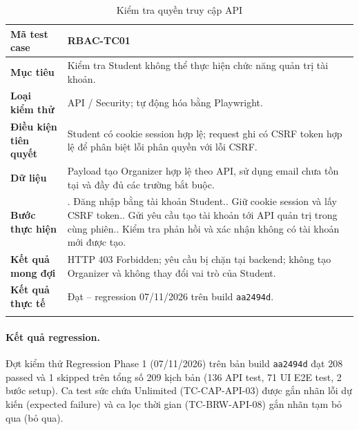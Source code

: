 \begin{table}[H]
\centering
\begingroup\small
\renewcommand{\arraystretch}{1.18}
\caption{Kiểm tra quyền truy cập API}\label{tab:i1-detail-5}
\begin{tabularx}{\linewidth}{@{}p{.23\linewidth}>{\raggedright\arraybackslash}X@{}}
\toprule
\textbf{Mã test case} & \textbf{RBAC-TC01} \\\midrule
\textbf{Mục tiêu} & Kiểm tra Student không thể thực hiện chức năng quản trị tài khoản. \\ \addlinespace[3pt]
\textbf{Loại kiểm thử} & API / Security; tự động hóa bằng Playwright. \\ \addlinespace[3pt]
\textbf{Điều kiện tiên quyết} & Student có cookie session hợp lệ; request ghi có CSRF token hợp lệ để phân biệt lỗi phân quyền với lỗi CSRF. \\ \addlinespace[3pt]
\textbf{Dữ liệu} & Payload tạo Organizer hợp lệ theo API, sử dụng email chưa tồn tại và đầy đủ các trường bắt buộc. \\ \addlinespace[3pt]
\textbf{Bước thực hiện} & 1. Đăng nhập bằng tài khoản Student.\newline 2. Giữ cookie session và lấy CSRF token.\newline 3. Gửi yêu cầu tạo tài khoản tới API quản trị trong cùng phiên.\newline 4. Kiểm tra phản hồi và xác nhận không có tài khoản mới được tạo. \\ \addlinespace[3pt]
\textbf{Kết quả mong đợi} & HTTP 403 Forbidden; yêu cầu bị chặn tại backend; không tạo Organizer và không thay đổi vai trò của Student. \\ \addlinespace[3pt]
\textbf{Kết quả thực tế} & Đạt -- regression 07/11/2026 trên build \texttt{aa2494d}.\\ \addlinespace[3pt]
\bottomrule
\end{tabularx}
\endgroup
\end{table}

\paragraph{Kết quả regression.}
Đợt kiểm thử Regression Phase 1 (07/11/2026) trên bản build \texttt{aa2494d} đạt 208 passed và 1 skipped trên tổng số 209 kịch bản (136 API test, 71 UI E2E test, 2 bước setup). Ca test sức chứa Unlimited (TC-CAP-API-03) được gắn nhãn lỗi dự kiến (expected failure) và ca lọc thời gian (TC-BRW-API-08) gắn nhãn tạm bỏ qua (bỏ qua).


